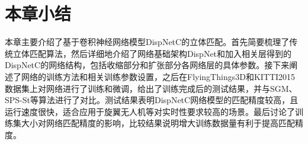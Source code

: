 
\section{本章小结}
本章主要介绍了基于卷积神经网络模型DispNetC的立体匹配。首先简要梳理了传统立体匹配算法，然后详细地介绍了网络基础架构DispNet和加入相关层得到的DispNetC的网络结构，包括收缩部分和扩张部分各网络层的具体参数。接下来阐述了网络的训练方法和相关训练参数设置，之后在FlyingThings3D和KITTI2015数据集上对网络进行了训练和微调，给出了训练完成后的测试结果，并与SGM、SPS-St等算法进行了对比。测试结果表明DispNetC网络模型的匹配精度较高，且运行速度很快，适合应用于旋翼无人机等对实时性要求较高的场景。最后讨论了训练集大小对网络匹配精度的影响，比较结果说明增大训练数据量有利于提高匹配精度。







